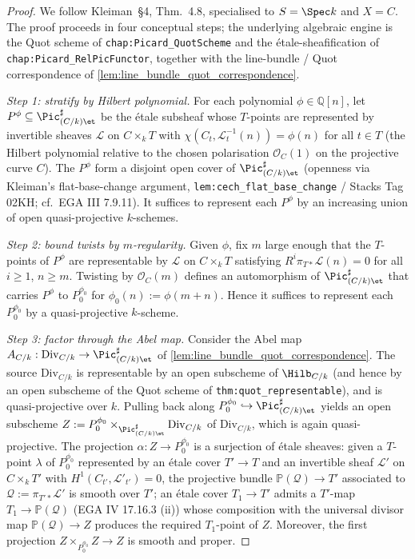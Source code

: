 \begin{proof}
  
  We follow Kleiman~\S 4, Thm.~4.8, specialised to \(S = \Spec k\) and
  \(X = C\). The proof proceeds in four conceptual steps; the underlying
  algebraic engine is the Quot scheme of \texttt{chap:Picard\_QuotScheme}
  and the \'etale-sheafification of \texttt{chap:Picard\_RelPicFunctor},
  together with the line-bundle / Quot correspondence of
  \cref{lem:line_bundle_quot_correspondence}.

  \emph{Step 1: stratify by Hilbert polynomial.}
  For each polynomial \(\phi \in \mathbb{Q}[n]\), let \(P^\phi \subseteq
  \Pic^\sharp_{(C/k)\et}\) be the \'etale subsheaf whose \(T\)-points are
  represented by invertible sheaves \(\mathcal{L}\) on \(C \times_k T\) with
  \(\chi(C_t, \mathcal{L}_t^{-1}(n)) = \phi(n)\) for all \(t \in T\) (the
  Hilbert polynomial relative to the chosen polarisation
  \(\mathcal{O}_C(1)\) on the projective curve \(C\)). The \(P^\phi\) form a
  disjoint open cover of \(\Pic^\sharp_{(C/k)\et}\) (openness via Kleiman's
  flat-base-change argument, \texttt{lem:cech\_flat\_base\_change} / Stacks Tag 02KH;
  cf.\ EGA III 7.9.11). It suffices to
  represent each \(P^\phi\) by an increasing union of open quasi-projective
  \(k\)-schemes.

  \emph{Step 2: bound twists by \(m\)-regularity.}
  Given \(\phi\), fix \(m\) large enough that the \(T\)-points of \(P^\phi\) are
  representable by \(\mathcal{L}\) on \(C \times_k T\) satisfying
  \(R^i \pi_{T*} \mathcal{L}(n) = 0\) for all \(i \ge 1\), \(n \ge m\). Twisting
  by \(\mathcal{O}_C(m)\) defines an automorphism of \(\Pic^\sharp_{(C/k)\et}\)
  that carries \(P^\phi\) to \(P^{\phi_0}_0\) for \(\phi_0(n) := \phi(m + n)\).
  Hence it suffices to represent each \(P^{\phi_0}_0\) by a quasi-projective
  \(k\)-scheme.

  \emph{Step 3: factor through the Abel map.}
  Consider the Abel map \(A_{C/k} : \mathrm{Div}_{C/k} \to \Pic^\sharp_{(C/k)\et}\)
  of \cref{lem:line_bundle_quot_correspondence}. The source \(\mathrm{Div}_{C/k}\)
  is representable by an open subscheme of \(\Hilb_{C/k}\) (and hence by an
  open subscheme of the Quot scheme of \texttt{thm:quot\_representable}), and
  is quasi-projective over \(k\). Pulling back along
  \(P^{\phi_0}_0 \hookrightarrow \Pic^\sharp_{(C/k)\et}\) yields an open
  subscheme \(Z := P^{\phi_0}_0 \times_{\Pic^\sharp_{(C/k)\et}} \mathrm{Div}_{C/k}\)
  of \(\mathrm{Div}_{C/k}\), which is again quasi-projective. The projection
  \(\alpha : Z \to P^{\phi_0}_0\) is a surjection of \'etale sheaves:
  given a \(T\)-point \(\lambda\) of \(P^{\phi_0}_0\) represented by an \'etale
  cover \(T' \to T\) and an invertible sheaf \(\mathcal{L}'\) on \(C \times_k
  T'\) with \(H^1(C_{t'}, \mathcal{L}'_{t'}) = 0\), the projective bundle
  \(\mathbb{P}(\mathcal{Q}) \to T'\) associated to
  \(\mathcal{Q} := \pi_{T'*}\mathcal{L}'\) is smooth over \(T'\); an \'etale
  cover \(T_1 \to T'\) admits a \(T'\)-map \(T_1 \to \mathbb{P}(\mathcal{Q})\)
  (EGA IV 17.16.3 (ii)) whose composition with the universal divisor map
  \(\mathbb{P}(\mathcal{Q}) \to Z\) produces the required \(T_1\)-point of \(Z\).
  Moreover, the first projection \(Z \times_{P^{\phi_0}_0} Z \to Z\) is
  smooth and proper.


\end{proof}
